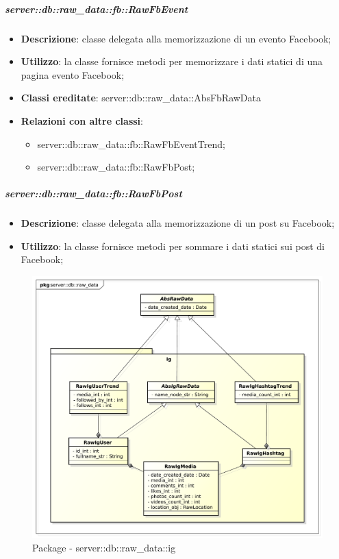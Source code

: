 		\subparagraph{server::db::raw\_data::fb::RawFbEvent} %
		\label{subp:server_db_raw_data_fb_rawfbevent}
			\begin{itemize}
				\item \textbf{Descrizione}: classe delegata alla memorizzazione di un evento Facebook;
				\item \textbf{Utilizzo}: la classe fornisce metodi per memorizzare i dati statici di una pagina evento Facebook;
				\item \textbf{Classi ereditate}: server::db::raw\_data::AbsFbRawData
				\item \textbf{Relazioni con altre classi}:
					\begin{itemize}
						\item server::db::raw\_data::fb::RawFbEventTrend;
						\item server::db::raw\_data::fb::RawFbPost;
					\end{itemize}
			\end{itemize}


		\subparagraph{server::db::raw\_data::fb::RawFbPost} %
		\label{subp:server_db_raw_data_fb_rawfbpost}
			\begin{itemize}
				\item \textbf{Descrizione}: classe delegata alla memorizzazione di un post su Facebook;
				\item \textbf{Utilizzo}: la classe fornisce metodi per sommare i dati statici sui post di Facebook;
			\end{itemize}




		\begin{figure}[htbp]
			\centering
			\centerline{\includegraphics[scale=0.5]{./images/server/raw_data_ig.pdf}}
			\caption{Package - server::db::raw\_data::ig}
		\end{figure}


